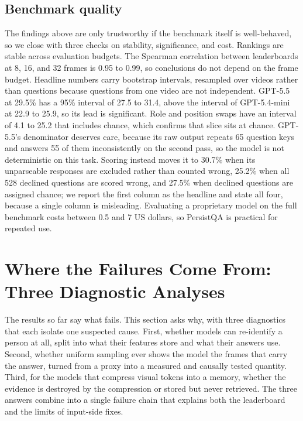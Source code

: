 \documentclass{article}
\newcommand{\bench}{PersistQA}
\begin{document}
\subsection{Benchmark quality}
\label{sec:quality}
The findings above are only trustworthy if the benchmark itself is well-behaved, so we close with three checks on stability, significance, and cost. Rankings are stable across evaluation budgets. The Spearman correlation between leaderboards at 8, 16, and 32 frames is 0.95 to 0.99, so conclusions do not depend on the frame budget. Headline numbers carry bootstrap intervals, resampled over videos rather than questions because questions from one video are not independent. GPT-5.5 at 29.5\% has a 95\% interval of 27.5 to 31.4, above the interval of GPT-5.4-mini at 22.9 to 25.9, so its lead is significant. Role and position swaps have an interval of 4.1 to 25.2 that includes chance, which confirms that slice sits at chance. GPT-5.5's denominator deserves care, because its raw output repeats 65 question keys and answers 55 of them inconsistently on the second pass, so the model is not deterministic on this task. Scoring instead moves it to 30.7\% when its unparseable responses are excluded rather than counted wrong, 25.2\% when all 528 declined questions are scored wrong, and 27.5\% when declined questions are assigned chance; we report the first column as the headline and state all four, because a single column is misleading. Evaluating a proprietary model on the full benchmark costs between 0.5 and 7 US dollars, so \bench{} is practical for repeated use.

\section{Where the Failures Come From: Three Diagnostic Analyses}
\label{sec:diagnostics}
The results so far say what fails. This section asks why, with three diagnostics that each isolate one suspected cause. First, whether models can re-identify a person at all, split into what their features store and what their answers use. Second, whether uniform sampling ever shows the model the frames that carry the answer, turned from a proxy into a measured and causally tested quantity. Third, for the models that compress visual tokens into a memory, whether the evidence is destroyed by the compression or stored but never retrieved. The three answers combine into a single failure chain that explains both the leaderboard and the limits of input-side fixes.
\end{document}
